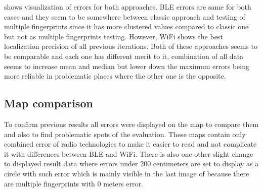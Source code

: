  shows visualization of errors for both approaches. BLE errors are same for both cases and they seem to be somewhere between classic approach and testing of multiple fingerprints since it has more clustered values compared to classic one but not as multiple fingerprints testing. However, WiFi shows the best localization precision of all previous iterations. Both of these approaches seems to be comparable and each one has different merit to it, combination of all data seems to increase mean and median but lower down the maximum errors being more reliable in problematic places where the other one is the opposite.

\subsection{Map comparison}\label{sec:MapComparison}
To confirm previous results all errors were displayed on the map to compare them and also to find problematic spots of the evaluation. These maps contain only combined error of radio technologies to make it easier to read and not complicate it with differences between BLE and WiFi. There is also one other slight change to displayed result data where errors under 200 centimeters are set to display as a circle with such error which is mainly visible in the last image of  because there are multiple fingerprints with 0 meters error.

